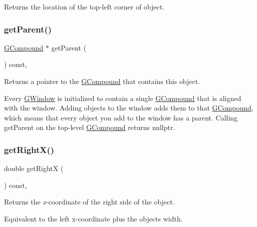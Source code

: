 Returns the location of the top-\/left corner of object. 

\mbox{\label{classGObject_a3e53cef70541b1a14eade4ad0984d0b4}} 
\subsubsection{\texorpdfstring{get\+Parent()}{getParent()}}
{\footnotesize\ttfamily \mbox{\hyperlink{classGCompound}{G\+Compound}} $\ast$ get\+Parent (\begin{DoxyParamCaption}{ }\end{DoxyParamCaption}) const\hspace{0.3cm}{\ttfamily [virtual]}, {\ttfamily [inherited]}}



Returns a pointer to the {\ttfamily \mbox{\hyperlink{classGCompound}{G\+Compound}}} that contains this object. 

Every {\ttfamily \mbox{\hyperlink{classGWindow}{G\+Window}}} is initialized to contain a single {\ttfamily \mbox{\hyperlink{classGCompound}{G\+Compound}}} that is aligned with the window. Adding objects to the window adds them to that {\ttfamily \mbox{\hyperlink{classGCompound}{G\+Compound}}}, which means that every object you add to the window has a parent. Calling {\ttfamily get\+Parent} on the top-\/level {\ttfamily \mbox{\hyperlink{classGCompound}{G\+Compound}}} returns {\ttfamily nullptr}. \mbox{\label{classGObject_a798cc79daaa10145b28f60bcdfdb0ee9}} 
\subsubsection{\texorpdfstring{get\+Right\+X()}{getRightX()}}
{\footnotesize\ttfamily double get\+RightX (\begin{DoxyParamCaption}{ }\end{DoxyParamCaption}) const\hspace{0.3cm}{\ttfamily [virtual]}, {\ttfamily [inherited]}}



Returns the {\itshape x}-\/coordinate of the right side of the object. 

Equivalent to the left x-\/coordinate plus the object\textquotesingle{}s width. \mbox{\label{classGObject_a7b4eec96a2bdc6420695d5796a78eea9}} 
